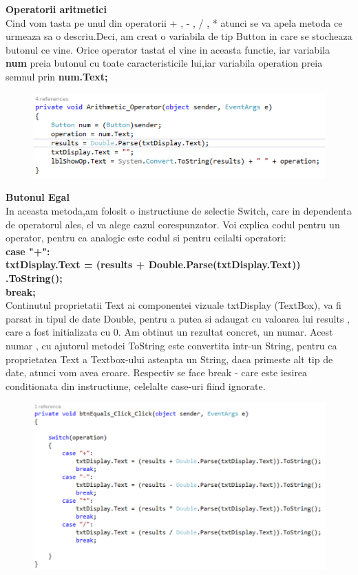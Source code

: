 \textbf{Operatorii aritmetici } \\
Cind vom tasta pe unul din operatorii + , - , / , * atunci se va apela metoda ce urmeaza sa o descriu.Deci, am creat o variabila de tip Button in care se stocheaza butonul ce vine. Orice operator tastat el vine in aceasta functie, iar variabila \textbf{num} preia butonul cu toate caracteristicile lui,iar variabila operation preia semnul prin \textbf{num.Text;}
\begin{figure}[h]
\centering
\includegraphics[scale=1]{3.pdf}
\end{figure}

\textbf{Butonul Egal } \\
In aceasta metoda,am folosit o instructiune de selectie Switch, care in dependenta de operatorul ales, el va alege cazul corespunzator. Voi explica codul pentru un operator, pentru ca analogic este codul si pentru ceilalti operatori: \\
\textbf{case "+": \\
\tab \tab txtDisplay.Text = (results + Double.Parse(txtDisplay.Text)) .ToString();\\
\tab break;}\\
Continutul proprietatii Text ai componentei vizuale txtDisplay (TextBox), va fi parsat in tipul de date Double, pentru a putea si adaugat cu valoarea lui results , care a fost initializata cu 0. Am obtinut un rezultat concret, un numar. Acest numar , cu ajutorul metodei ToString este convertita intr-un String, pentru ca proprietatea Text a Textbox-ului asteapta un String, daca primeste alt tip de date, atunci vom avea eroare. Respectiv se face break - care este iesirea conditionata din instructiune, celelalte case-uri fiind ignorate. 
\begin{figure}[h]
\centering
\includegraphics[scale=1]{4.pdf}
\end{figure}
\clearpage

